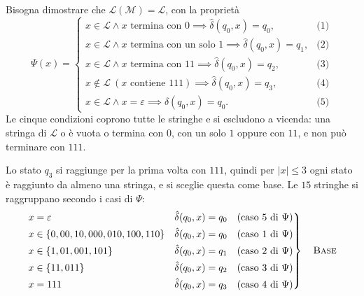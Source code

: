 \documentclass[a4paper, 11pt, oneside]{book}
\theoremstyle{formale}
\begin{document}
    Bisogna dimostrare che $\mathcal{L}(\mathcal{M}) = \mathcal{L}$, con la propriet\`a
    \begin{equation*}
        \Psi(x) =
        \begin{cases}
            x \in \mathcal{L} \land x \text{ termina con } 0
                \implies \hat{\delta}(q_0, x) = q_0,
                & \text{(1)} \\
            x \in \mathcal{L} \land x \text{ termina con un solo } 1
                \implies \hat{\delta}(q_0, x) = q_1,
                & \text{(2)} \\
            x \in \mathcal{L} \land x \text{ termina con } 11
                \implies \hat{\delta}(q_0, x) = q_2,
                & \text{(3)} \\
            x \notin \mathcal{L}\ (x \text{ contiene } 111)
                \implies \hat{\delta}(q_0, x) = q_3,
                & \text{(4)} \\
            x \in \mathcal{L} \land x = \varepsilon
                \implies \hat{\delta}(q_0, x) = q_0.
                & \text{(5)}
        \end{cases}
    \end{equation*}
    Le cinque condizioni coprono tutte le stringhe e si escludono a vicenda: una stringa
    di $\mathcal{L}$ o \`e vuota o termina con $0$, con un solo $1$ oppure con $11$, e non
    pu\`o terminare con $111$.

    Lo stato $q_3$ si raggiunge per la prima volta con $111$, quindi per $|x| \leq 3$ ogni
    stato \`e raggiunto da almeno una stringa, e si sceglie questa come base. Le $15$
    stringhe si raggruppano secondo i casi di $\Psi$:
    \begin{equation*}
        \left.
        \begin{alignedat}{2}
            & x = \varepsilon & \quad & \hat{\delta}(q_0, x) = q_0
                \quad \text{(caso 5 di $\Psi$)} \\
            & x \in \{0, 00, 10, 000, 010, 100, 110\} & & \hat{\delta}(q_0, x) = q_0
                \quad \text{(caso 1 di $\Psi$)} \\
            & x \in \{1, 01, 001, 101\} & & \hat{\delta}(q_0, x) = q_1
                \quad \text{(caso 2 di $\Psi$)} \\
            & x \in \{11, 011\} & & \hat{\delta}(q_0, x) = q_2
                \quad \text{(caso 3 di $\Psi$)} \\
            & x = 111 & & \hat{\delta}(q_0, x) = q_3
                \quad \text{(caso 4 di $\Psi$)}
        \end{alignedat}
        \right\}
        \quad \text{\textsc{Base}}
    \end{equation*}
\end{document}
